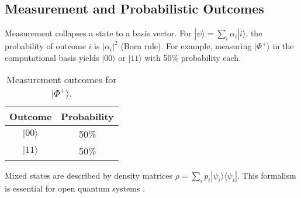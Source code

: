 \subsection{Measurement and Probabilistic Outcomes}
\label{subsec:measurement}

Measurement collapses a state to a basis vector. For $|\psi\rangle = \sum_i \alpha_i|i\rangle$, the probability of outcome $i$ is $|\alpha_i|^2$ (Born rule). For example, measuring $|\Phi^+\rangle$ in the computational basis yields $|00\rangle$ or $|11\rangle$ with 50\% probability each.

\begin{table}[h]
\centering
\caption{Measurement outcomes for $|\Phi^+\rangle$.}
\label{tab:bell_measurement}
\begin{tabular}{|c|c|}
\hline
\textbf{Outcome} & \textbf{Probability} \\ \hline
$|00\rangle$      & 50\%                \\ \hline
$|11\rangle$      & 50\%                \\ \hline
\end{tabular}
\end{table}

Mixed states are described by density matrices $\rho = \sum_i p_i |\psi_i\rangle\langle\psi_i|$. This formalism is essential for open quantum systems \cite{breuer2002theory}.